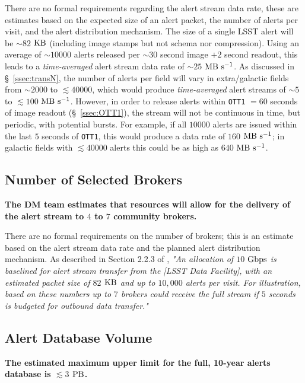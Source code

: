 \documentclass[DM,authoryear,toc]{lsstdoc}
\begin{document}
There are no formal requirements regarding the alert stream data rate, these are estimates based on the expected size of an alert packet, the number of alerts per visit, and the alert distribution mechanism. The size of a single LSST alert will be $\sim82$ $\rm KB$ (including image stamps but not schema nor compression). Using an average of $\sim10000$ alerts released per $\sim30$ second image $+2$ second readout, this leads to a {\it time-averaged} alert stream data rate of  $\sim25$ $\rm MB\ s^{-1}$. As discussed in \S~\ref{ssec:transN}, the number of alerts per field will vary in extra/galactic fields from $\sim2000$ to $\lesssim40000$, which would produce {\it time-averaged} alert streams of $\sim5$ to $\lesssim100$ $\rm MB\ s^{-1}$. However, in order to release alerts within {\tt OTT1} $=60$ seconds of image readout (\S~\ref{ssec:OTT1}), the stream will not be continuous in time, but periodic, with potential bursts. For example, if all $10000$ alerts are issued within the last $5$ seconds of {\tt OTT1}, this would produce a data rate of $160$ $\rm MB\ s^{-1}$; in galactic fields with $\lesssim40000$ alerts this could be as high as $640$ $\rm MB\ s^{-1}$.


\subsection{Number of Selected Brokers}\label{ssec:num_brokers}

{\bf The DM team estimates that resources will allow for the delivery of the alert stream to $4$ to $7$ community brokers.}

There are no formal requirements on the number of brokers; this is an estimate based on the alert stream data rate and the planned alert distribution mechanism. As described in Section 2.2.3 of , {\it "An allocation of $10$ $\rm Gbps$ is baselined for alert stream transfer from the [LSST Data Facility], with an estimated packet size of $82$ $\rm KB$ and up to $10,000$ alerts per visit. For illustration, based on these numbers up to $7$ brokers could receive the full stream if $5$ seconds is budgeted for outbound data transfer."} 


\subsection{Alert Database Volume}\label{ssec:adb_volume}

{\bf The estimated maximum upper limit for the full, 10-year alerts database is $\lesssim3$ $\rm PB$.}
\end{document}
